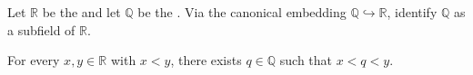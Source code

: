 \begin{proposition} \label{proposition:field_of_rational_numbers_is_dense_in_field_of_real_numbers}
    Let $\mathbb{R}$ be the  and let $\mathbb{Q}$ be the . Via the canonical embedding $\mathbb{Q} \hookrightarrow \mathbb{R}$, identify $\mathbb{Q}$ as a subfield of $\mathbb{R}$.

    For every $x, y \in \mathbb{R}$ with $x < y$, there exists $q \in \mathbb{Q}$ such that $x < q < y$.
\end{proposition}

